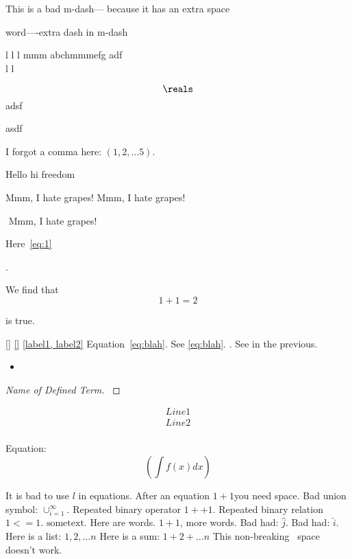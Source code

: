 This is a bad m-dash---
because it has an extra space

word----extra dash in m-dash
  
 \hat{\jmath} l  l l    mmm abchmmmefg adf
 $$ $$  
 l  l

 
  \[{\reals}\]  
adsf  
    
 
asdf

I forgot a comma here: $(1, 2, \dots 5)$.

\cite{} %

Hello hi freedom

Mmm, I hate grapes! 
Mmm, I hate grapes! 

$$ $$ $$ $$
$ $
Mmm, I hate grapes! 


Here~\cref{eq:1}

\[
    
\].

We find that
\[
    1 + 1 = 2
\] 

is true.
 
\ref{} 
\cref{}
\cite{}
\label{\alpha}
\label{a,b} 
\cref{label1, label2}
Equation~\ref{eq:blah}.
See \cref{eq:blah}.
\cite[Theorem 1]{a}. 
See in the previous.


\begin{itemize}
    a
    \item  
\end{itemize}

\begin{proof}[Name of Defined Term]
    \label{def:Name of Defined Term}
    

\end{proof}
\begin{align}
    Line 1 \\
    Line 2 \\
\end{align}

Equation:
\[
    (\int f(x) dx)
\] 


It is bad to use $l$ in equations.
After an equation $1+1$you need space.
Bad union symbol: $\cup_{i=1}^\infty$.
Repeated binary operator $1 ++ 1$.
Repeated binary relation $1 <= 1$.
$\mathrm{some text}$.
Here are words. $1 + 1$, more words.
Bad had: $\hat{j}$.
Bad had: $\hat i$.
Here is a list: $1, 2, \dots n$
Here is a sum: $1 + 2 + \dots n$
This non-breaking~ space doesn't work.

